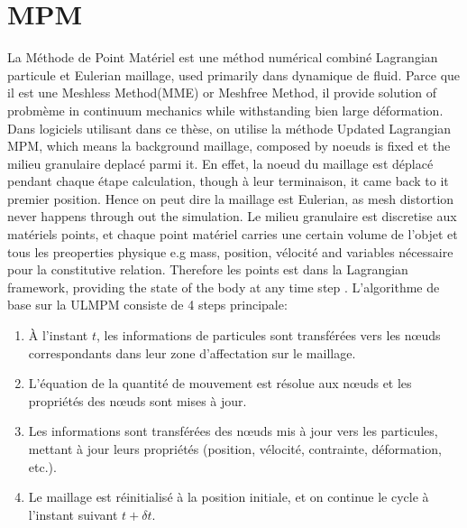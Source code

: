 \documentclass[a4paper,12pt]{report}
\begin{document}
\section{MPM}
La Méthode de Point Matériel est une méthod numérical combiné Lagrangian particule et Eulerian maillage, used primarily dans dynamique de fluid. Parce que il est une Meshless Method(MME) or Meshfree Method, il provide solution of probmème in continuum mechanics while withstanding bien large déformation. 
Dans logiciels utilisant dans ce thèse, on utilise la méthode Updated Lagrangian MPM, which means la background maillage, composed by noeuds is fixed et the milieu granulaire deplacé parmi it. 
En effet, la noeud du maillage est déplacé pendant chaque étape calculation, though à leur terminaison, it came back to it premier position. Hence on peut dire la maillage est Eulerian, as mesh distortion never happens through out the simulation.
Le milieu granulaire est discretise aux matériels points, et chaque point matériel carries une certain volume de l'objet et tous les preoperties physique e.g mass, position, vélocité and variables nécessaire pour la constitutive relation.
Therefore les points est dans la Lagrangian framework, providing the state of the body at any time step \cite{danies2018application}.
L'algorithme de base sur la ULMPM consiste de 4 steps principale:
\begin{enumerate}
\item À l'instant $t$, les informations de particules sont transférées vers les nœuds correspondants dans leur zone d'affectation sur le maillage.
\item L'équation de la quantité de mouvement est résolue aux nœuds et les propriétés des nœuds sont mises à jour.
\item Les informations sont transférées des nœuds mis à jour vers les particules, mettant à jour leurs propriétés (position, vélocité, contrainte, déformation, etc.).
\item Le maillage est réinitialisé à la position initiale, et on continue le cycle à l'instant suivant $t + \delta t$.
\end{enumerate}
\end{document}
